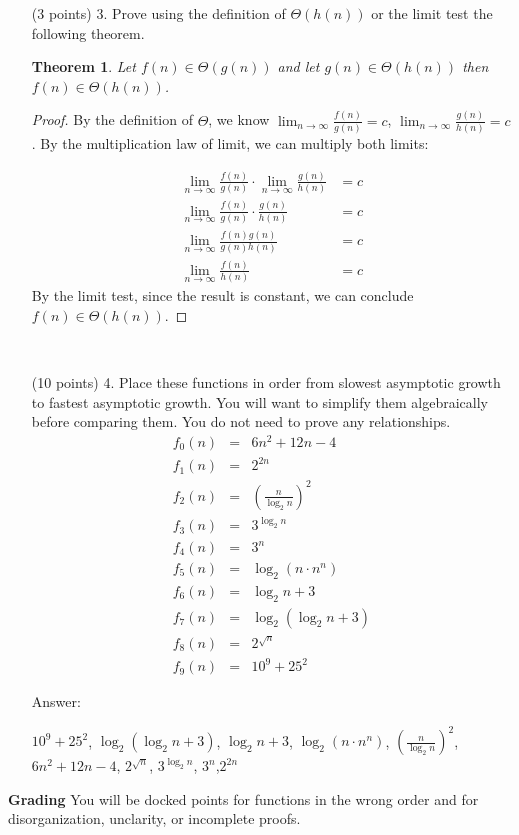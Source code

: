 \documentclass[paper=a4, fontsize=11pt]{scrartcl}
\newtheorem{theorem}{Theorem}
\numberwithin{equation}{section}		%
\numberwithin{figure}{section}			%
\numberwithin{table}{section}				%
\begin{document}
\begin{enumerate}
\

\item [(3 points) 3.] Prove using the definition of $\Theta(h(n))$ or the limit test the following theorem.

\begin{theorem}
Let $f(n)\in\Theta(g(n))$ and let $g(n)\in\Theta(h(n))$ then $f(n)\in\Theta(h(n))$.
\end{theorem}
\begin{proof}
	By the definition of $\Theta$, we know $\displaystyle\lim_{n\rightarrow\infty}\frac{f(n)}{g(n)} = c$, $\displaystyle\lim_{n\rightarrow\infty}\frac{g(n)}{h(n)} = c$. By the multiplication law of limit, we can multiply both limits:
	
	\begin{align*}
		\displaystyle\lim_{n\rightarrow\infty}\frac{f(n)}{g(n)} \cdot \displaystyle\lim_{n\rightarrow\infty}\frac{g(n)}{h(n)} &= c \\
		\lim_{n\rightarrow\infty}\frac{f(n)}{g(n)} \cdot \frac{g(n)}{h(n)} &= c \\
		\lim_{n\rightarrow\infty}\frac{f(n)g(n)}{g(n)h(n)} &= c \\
		\lim_{n\rightarrow\infty}\frac{f(n)}{h(n)} &= c
	\end{align*}
	By the limit test, since the result is constant, we can conclude $f(n)\in\Theta(h(n))$.
\end{proof}

\

\item [(10 points) 4.] Place these functions in order from slowest asymptotic growth to fastest asymptotic growth.  You will want to simplify them algebraically before comparing them.  You do not need to prove any relationships.
\begin{eqnarray*}
f_0(n) & = & 6n^2 + 12n - 4 \\
f_1(n) & = & 2^{2n}  \\
f_2(n) & = & \left(\frac{n}{\log_2n}\right)^2 \\
f_3(n) & = & 3^{\log_2n} \\
f_4(n) & = & 3^n \\
f_5(n) & = & \log_2(n\cdot n^n) \\
f_6(n) & = & \log_2n + 3 \\
f_7(n) & = & \log_2\left(\log_2n + 3\right) \\
f_8(n) & = & 2^{\sqrt{n}} \\ 
f_9(n) & = & 10^9 + 25^2
\end{eqnarray*}

Answer:

$10^9 + 25^2$, $\log_2\left(\log_2n + 3\right)$, $\log_2n + 3$, $\log_2(n\cdot n^n)$, $\left(\frac{n}{\log_2n}\right)^2$, $6n^2 + 12n - 4$, $2^{\sqrt{n}}$, $3^{\log_2n}$, $3^n$,$2^{2n}$


\end{enumerate}
\noindent\textbf{Grading} You will be docked points for functions in the wrong order and for disorganization, unclarity, or incomplete proofs. 
\end{document}
